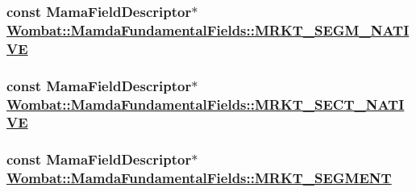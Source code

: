 \hypertarget{classWombat_1_1MamdaFundamentalFields_e9adfba169be32eba43965457e42bc83}{
\subsubsection[MRKT\_\-SEGM\_\-NATIVE]{\setlength{\rightskip}{0pt plus 5cm}const Mama\-Field\-Descriptor$\ast$ \hyperlink{classWombat_1_1MamdaFundamentalFields_e9adfba169be32eba43965457e42bc83}{Wombat::Mamda\-Fundamental\-Fields::MRKT\_\-SEGM\_\-NATIVE}}}
\label{classWombat_1_1MamdaFundamentalFields_e9adfba169be32eba43965457e42bc83}


\hypertarget{classWombat_1_1MamdaFundamentalFields_04258afc5e61f2c7b63956f173056d0a}{
\subsubsection[MRKT\_\-SECT\_\-NATIVE]{\setlength{\rightskip}{0pt plus 5cm}const Mama\-Field\-Descriptor$\ast$ \hyperlink{classWombat_1_1MamdaFundamentalFields_04258afc5e61f2c7b63956f173056d0a}{Wombat::Mamda\-Fundamental\-Fields::MRKT\_\-SECT\_\-NATIVE}}}
\label{classWombat_1_1MamdaFundamentalFields_04258afc5e61f2c7b63956f173056d0a}


\hypertarget{classWombat_1_1MamdaFundamentalFields_4ad78b030704ffb11489a534363b33ca}{
\subsubsection[MRKT\_\-SEGMENT]{\setlength{\rightskip}{0pt plus 5cm}const Mama\-Field\-Descriptor$\ast$ \hyperlink{classWombat_1_1MamdaFundamentalFields_4ad78b030704ffb11489a534363b33ca}{Wombat::Mamda\-Fundamental\-Fields::MRKT\_\-SEGMENT}}}
\label{classWombat_1_1MamdaFundamentalFields_4ad78b030704ffb11489a534363b33ca}



